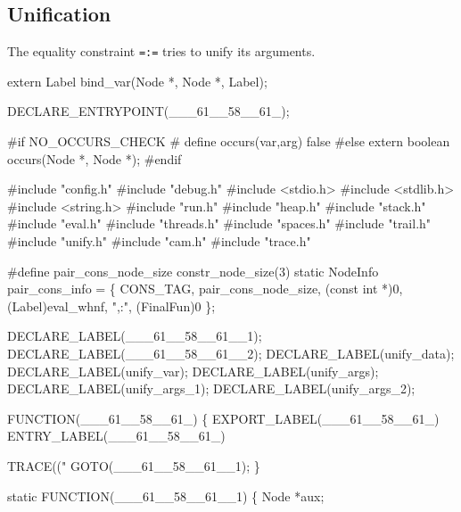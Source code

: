 %
%
\subsection{Unification}\label{sec:unification}
The equality constraint \texttt{=:=} tries to unify its arguments.

\nwenddocs{}\endmoddef\nwstartdeflinemarkup\nwenddeflinemarkup
extern Label bind_var(Node *, Node *, Label);

DECLARE_ENTRYPOINT(___61__58__61_);

#if NO_OCCURS_CHECK
# define occurs(var,arg)        false
#else
extern boolean occurs(Node *, Node *);
#endif

\nwendcode{}\nwdocspar
\nwenddocs{}\endmoddef\nwstartdeflinemarkup{}\nwenddeflinemarkup
#include "config.h"
#include "debug.h"
#include <stdio.h>
#include <stdlib.h>
#include <string.h>
#include "run.h"
#include "heap.h"
#include "stack.h"
#include "eval.h"
#include "threads.h"
#include "spaces.h"
#include "trail.h"
#include "unify.h"
#include "cam.h"
#include "trace.h"

#define pair_cons_node_size constr_node_size(3)
static
NodeInfo pair_cons_info = \{
    CONS_TAG, pair_cons_node_size, (const int *)0, (Label)eval_whnf,
    ",:", (FinalFun)0
\};

DECLARE_LABEL(___61__58__61__1);
DECLARE_LABEL(___61__58__61__2);
DECLARE_LABEL(unify_data);
DECLARE_LABEL(unify_var);
DECLARE_LABEL(unify_args);
DECLARE_LABEL(unify_args_1);
DECLARE_LABEL(unify_args_2);


FUNCTION(___61__58__61_)
\{
    EXPORT_LABEL(___61__58__61_)
 ENTRY_LABEL(___61__58__61_)

    TRACE(("%
    GOTO(___61__58__61__1);
\}

static
FUNCTION(___61__58__61__1)
\{
    Node *aux;

